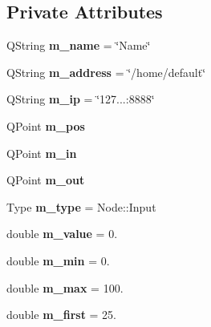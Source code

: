 \subsection*{Private Attributes}
\begin{DoxyCompactItemize}
\item 
\mbox{\label{classNode_a212e46e3de8f152be26c55810f504bd0}} 
Q\+String {\bfseries m\+\_\+name} = \char`\"{}Name\char`\"{}
\item 
\mbox{\label{classNode_a229782743d15a6963d87ba406bac67c4}} 
Q\+String {\bfseries m\+\_\+address} = \char`\"{}/home/default\char`\"{}
\item 
\mbox{\label{classNode_a9eef6ea1453c387e542e23e85a571fdf}} 
Q\+String {\bfseries m\+\_\+ip} = \char`\"{}127...\+:8888\char`\"{}
\item 
\mbox{\label{classNode_a43c294b967c1b5a6b73060d51824aa4d}} 
Q\+Point {\bfseries m\+\_\+pos}
\item 
\mbox{\label{classNode_a8dc9a65d78186e49bbc5fe817b1104f2}} 
Q\+Point {\bfseries m\+\_\+in}
\item 
\mbox{\label{classNode_ab8f3fbda818d7454fa5cb34e078418f3}} 
Q\+Point {\bfseries m\+\_\+out}
\item 
\mbox{\label{classNode_a82da945ee34133f197fd8dcefc9070a0}} 
Type {\bfseries m\+\_\+type} = Node\+::\+Input
\item 
\mbox{\label{classNode_a7dc02eca908f23a9bf1286d64e9d85c6}} 
double {\bfseries m\+\_\+value} = 0.
\item 
\mbox{\label{classNode_a6c5c7957cd96ee186cd172f0ca160cff}} 
double {\bfseries m\+\_\+min} = 0.
\item 
\mbox{\label{classNode_a989f95ea5a316010c4e10f8f4b9dda9f}} 
double {\bfseries m\+\_\+max} = 100.
\item 
\mbox{\label{classNode_ab7660bde372ab02cedcbb810ed878216}} 
double {\bfseries m\+\_\+first} = 25.
\item 

\end{DoxyCompactItemize}
